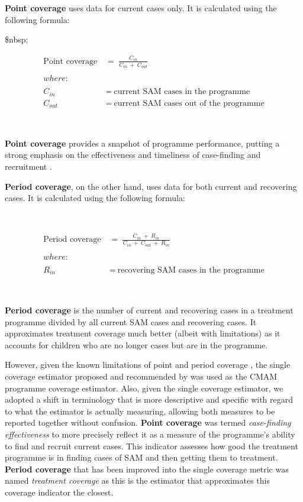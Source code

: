 \documentclass[12pt,a4paper]{article}
\begin{document}
\textbf{Point coverage} uses data for current cases only. It is calculated using the following formula:

\$nbsp;

\[\begin{aligned} 
\text{Point coverage} & ~ = ~ \frac{C_{in}}{C_{in} ~ + ~ C_{out}} \\
\\
where: & \\
\\
C_{in} & ~ = ~ \text{current SAM cases in the programme} \\
C_{out} & ~ = ~ \text{current SAM cases out of the programme}
\end{aligned}\]

~

\textbf{Point coverage} provides a snapshot of programme performance, putting a strong emphasis on the effectiveness and timeliness of case-finding and recruitment \citep{Myatt:2012tt}.

\textbf{Period coverage}, on the other hand, uses data for both current and recovering cases. It is calculated using the following formula:

~

\[\begin{aligned}
\text{Period coverage} & ~ = ~ \frac{C_{in} ~ + ~ R_{in}}{C_{in} ~ + ~ C_{out} ~ + ~ R_{in}} \\
\\
where: & \\
\\
R_{in} & ~ = ~ \text{recovering SAM cases in the programme}
\end{aligned}\]

~

\textbf{Period coverage} is the number of current and recovering cases in a treatment programme divided by all current SAM cases and recovering cases. It approximates treatment coverage much better (albeit with limitations) as it accounts for children who are no longer cases but are in the programme.

However, given the known limitations of point and period coverage \citep{Myatt:2012tt}, the single coverage estimator proposed and recommended by \citet{Balegamire:2015ud} was used as the CMAM programme coverage estimator. Also, given the single coverage estimator, we adopted a shift in terminology that is more descriptive and specific with regard to what the estimator is actually measuring, allowing both measures to be reported together without confusion. \textbf{Point coverage} was termed \emph{case-finding effectiveness} to more precisely reflect it as a measure of the programme's ability to find and recruit current cases. This indicator assesses how good the treatment programme is in finding cases of SAM and then getting them to treatment. \textbf{Period coverage} that has been improved into the single coverage metric was named \emph{treatment coverage} as this is the estimator that approximates this coverage indicator the closest.
\end{document}
